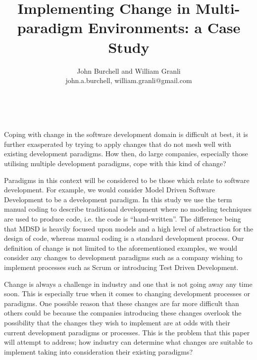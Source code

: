 \documentclass[10pt,twocolumn]{article}
\begin{document}
\title{Implementing Change in Multi-paradigm Environments: a Case Study}

\author{John Burchell and William Granli \\
john.a.burchell, william.granli@gmail.com}


\maketitle
\thispagestyle{empty}




​

Coping with change in the software development domain is difficult at best, it is further exasperated by trying to apply changes that do not mesh well with existing development paradigms. How then, do large companies, especially those utilising multiple development paradigms, cope with this kind of change?

Paradigms in this context will be considered to be those which relate to software development. For example, we would consider Model Driven Software Development to be a development paradigm. In this study we use the term manual coding to describe traditional development where no modeling techniques are used to produce code, i.e. the code is ``hand-written''. The difference being that MDSD is heavily focused upon models and a high level of abstraction for the design of code, whereas manual coding is a standard development process. Our definition of change is not limited to the aforementioned examples, we would consider any changes to development paradigms such as a company wishing to implement processes such as Scrum or introducing Test Driven Development.

Change is always a challenge in industry and one that is not going away any time soon. This is especially true when it comes to changing development processes or paradigms. One possible reason that these changes are far more difficult than others could be because the companies introducing these changes overlook the possibility that the changes they wish to implement are at odds with their current development paradigms or processes. This is the problem that this paper will attempt to address; how industry can determine what changes are suitable to implement taking into consideration their existing paradigms?
\end{document}
